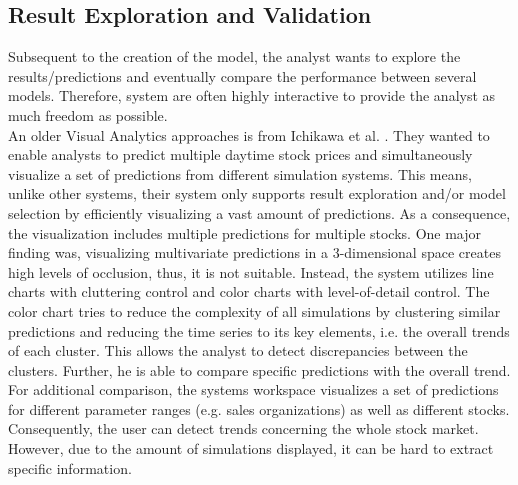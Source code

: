 \documentclass[electronic]{vgtc}             %
\begin{document}
\subsection{Result Exploration and Validation\label{sec:exploration}}
Subsequent to the creation of the model, the analyst wants to explore the results/predictions and eventually compare the performance between several models. 
Therefore, system are often highly interactive to provide the analyst as much freedom as possible.\cite{Lu:2017}\\
An older Visual Analytics approaches is from Ichikawa et al. \cite{ichikawa:2002}.
They wanted to enable analysts to predict multiple daytime stock prices and simultaneously visualize a set of predictions from different simulation systems. 
This means, unlike other systems, their system only supports result exploration and/or model selection by efficiently visualizing a vast amount of predictions.
As a consequence, the visualization includes multiple predictions for multiple stocks. 
One major finding was, visualizing multivariate predictions in a 3-dimensional space creates high levels of occlusion, thus, it is not suitable.
Instead, the system utilizes line charts with cluttering control and color charts with level-of-detail control. 
The color chart tries to reduce the complexity of all simulations by clustering similar predictions and reducing the time series to its key elements, i.e. the overall trends of each cluster.
This allows the analyst to detect discrepancies between the clusters.
Further, he is able to compare specific predictions with the overall trend. 
For additional comparison, the systems workspace visualizes a set of predictions for different parameter ranges (e.g. sales organizations) as well as different stocks.
Consequently, the user can detect trends concerning the whole stock market.  
However, due to the amount of simulations displayed, it can be hard to extract specific information.
\end{document}
